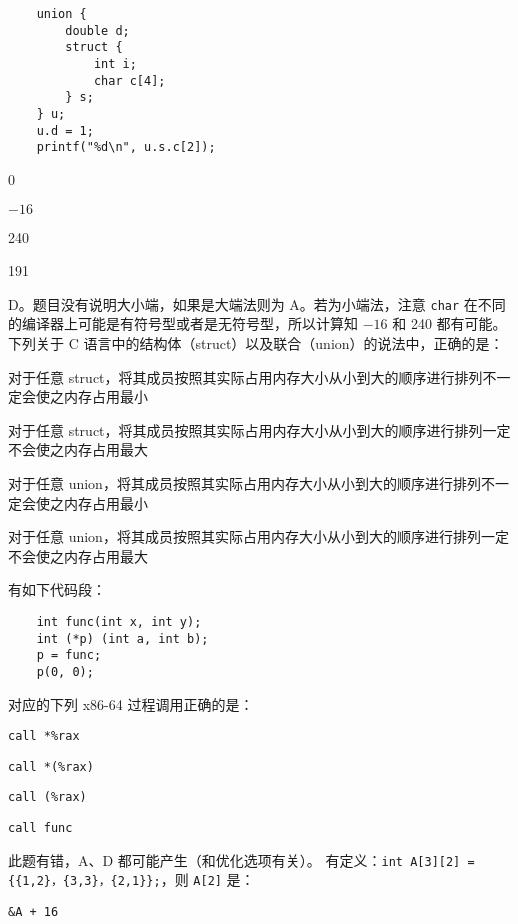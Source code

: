 \begin{problems}
\begin{verbatim}
    union {
        double d;
        struct {
            int i;
            char c[4];
        } s;
    } u;
    u.d = 1;
    printf("%d\n", u.s.c[2]);
        \end{verbatim}
        \begin{choices}
            \item 0
            \item $-16$
            \item 240
            \item 191
        \end{choices}
        \sol D。题目没有说明大小端，如果是大端法则为 A。若为小端法，注意 \verb|char| 在不同的编译器上可能是有符号型或者是无符号型，所以计算知 $-16$ 和 240 都有可能。
         下列关于 C 语言中的结构体（struct）以及联合（union）的说法中，正确的是：
        \begin{choices}
            \item 对于任意 struct，将其成员按照其实际占用内存大小从小到大的顺序进行排列不一定会使之内存占用最小
            \item 对于任意 struct，将其成员按照其实际占用内存大小从小到大的顺序进行排列一定不会使之内存占用最大
            \item 对于任意 union，将其成员按照其实际占用内存大小从小到大的顺序进行排列不一定会使之内存占用最小
            \item 对于任意 union，将其成员按照其实际占用内存大小从小到大的顺序进行排列一定不会使之内存占用最大
        \end{choices}
         有如下代码段：
        \begin{verbatim}
    int func(int x, int y);
    int (*p) (int a, int b);
    p = func;
    p(0, 0);
        \end{verbatim}
        对应的下列 x86-64 过程调用正确的是：
        \begin{choices}
            \item \verb|call *%rax|
            \item \verb|call *(%rax)|
            \item \verb|call (%rax)|
            \item \verb|call func|
        \end{choices}
        \sol 此题有错，A、D 都可能产生（和优化选项有关）。
         有定义：\verb|int A[3][2] = {{1,2}，{3,3}，{2,1}};|，则 \verb|A[2]| 是：
        \begin{choices}
            \item \verb|&A + 16|

\end{choices}
\end{problems}
